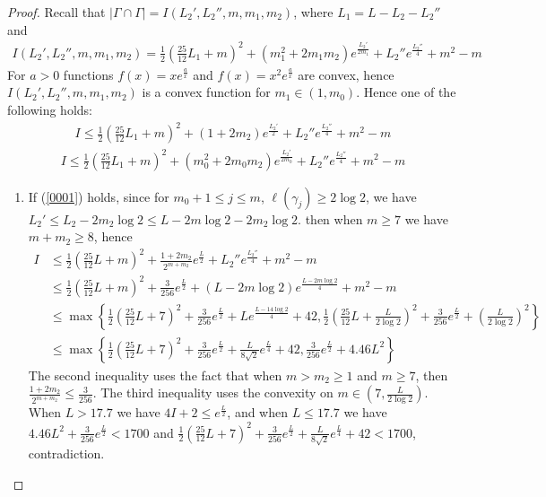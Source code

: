 \documentclass[10pt,a4paper]{amsart}
\newcommand{\abs}[1]{\left| #1 \right|}
\newcommand{\bracket}[1]{\left( #1 \right)}
\begin{document}
\begin{proof}
Recall that $\abs{\Gamma\cap\Gamma}=I(L_2',L_2'',m,m_1,m_2)$, where $L_1=L-L_2-L_2''$ and
\begin{align*}
I(L_2',L_2'',m,m_1,m_2)=\frac12\bracket{\frac{25}{12}L_1+m}^2+(m_1^2+2m_1m_2)e^{\frac{L_2'}{2m_1}}+{L_2''}e^{\frac{L_2''}4}+m^2-m
\end{align*}
For $a>0$ functions $f(x)=xe^{\frac{a}{x}}$ and $f(x)=x^2e^{\frac{a}{x}}$ are convex, hence $I(L_2',L_2'',m,m_1,m_2)$ is a convex function for $m_1\in(1,m_0)$. Hence one of the following holds:
\begin{align}\label{0001}
I\leqslant\frac12\bracket{\frac{25}{12}L_1+m}^2+(1+2m_2)e^{\frac{L_2'}{2}}+{L_2''}e^{\frac{L_2''}4}+m^2-m
\end{align}
\begin{align}\label{0002}
I\leqslant\frac12\bracket{\frac{25}{12}L_1+m}^2+(m_0^2+2m_0m_2)e^{\frac{L_2'}{2m_0}}+{L_2''}e^{\frac{L_2''}4}+m^2-m
\end{align}

\begin{enumerate}
\item
If (\ref{0001}) holds, since for $m_0+1\leqslant j\leqslant m$, $\ell(\gamma_j)\geqslant2\log2$, we have $L_2'\leqslant L_2-2m_2\log2\leqslant L-2m\log2-2m_2\log2$.  then when $m\geqslant7$ we have $m+m_2\geqslant8$, hence
\begin{align*}
 I&\leqslant\frac12\bracket{\frac{25}{12}L+m}^2+\frac{1+2m_2}{2^{m+m_2}}e^{\frac{L}{2}}+{L_2''}e^{\frac{L_2''}4}+m^2-m\\
&\leqslant\frac12\bracket{\frac{25}{12}L+m}^2+\frac{3}{256}e^{\frac{L}{2}}+(L-2m\log2)e^{\frac{L-2m\log2}4}+m^2-m\\
&\leqslant\max\left\{\frac12\bracket{\frac{25}{12}L+7}^2+\frac{3}{256}e^{\frac{L}{2}}+Le^{\frac{L-14\log2}4}+42,\frac12\bracket{\frac{25}{12}L+\frac{L}{2\log2}}^2+\frac{3}{256}e^{\frac{L}{2}}+\bracket{\frac{L}{2\log2}}^2\right\}\\
&\leqslant\max\left\{\frac12\bracket{\frac{25}{12}L+7}^2+\frac{3}{256}e^{\frac{L}{2}}+\frac{L}{8\sqrt2}e^{\frac{L}4}+42,\frac{3}{256}e^{\frac{L}{2}}+4.46L^2\right\}
\end{align*}
The second inequality uses the fact that when $m>m_2\geqslant1$ and $m\geqslant7$, then $\frac{1+2m_2}{2^{m+m_2}}\leqslant\frac3{256}$. The third inequality uses the convexity on $m\in(7,\frac{L}{2\log2})$. When $L>17.7$ we have $4I+2\leqslant e^{\frac{L}2}$, and when $L\leqslant17.7$ we have $4.46L^2+\frac{3}{256}e^{\frac{L}{2}}<1700$ and $\frac12\bracket{\frac{25}{12}L+7}^2+\frac{3}{256}e^{\frac{L}{2}}+\frac{L}{8\sqrt2}e^{\frac{L}4}+42<1700$, contradiction.


\end{enumerate}
\end{proof}
\end{document}
